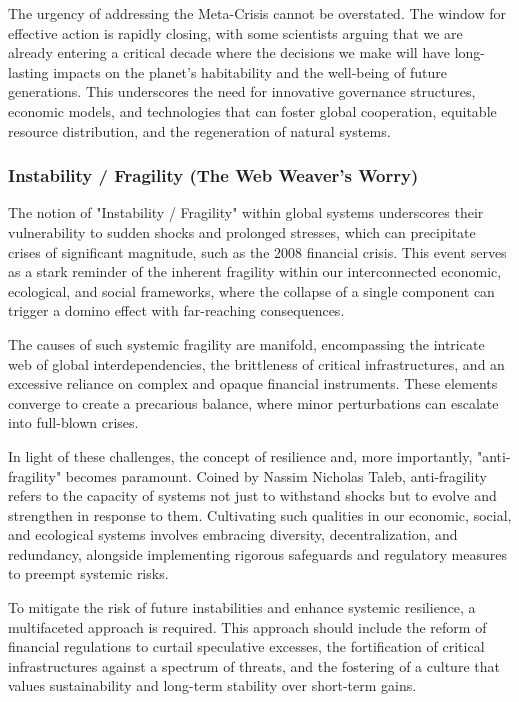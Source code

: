 \documentclass{article}
\begin{document}
The urgency of addressing the Meta-Crisis cannot be overstated. The window for effective action is rapidly closing, with some scientists arguing that we are already entering a critical decade where the decisions we make will have long-lasting impacts on the planet's habitability and the well-being of future generations\cite{SystemicSolutions}. This underscores the need for innovative governance structures, economic models, and technologies that can foster global cooperation, equitable resource distribution, and the regeneration of natural systems.

\subsubsection{Instability / Fragility (The Web Weaver's Worry)}
\label{sec:InstabilityFragility}

The notion of "Instability / Fragility" within global systems underscores their vulnerability to sudden shocks and prolonged stresses, which can precipitate crises of significant magnitude, such as the 2008 financial crisis. This event serves as a stark reminder of the inherent fragility within our interconnected economic, ecological, and social frameworks, where the collapse of a single component can trigger a domino effect with far-reaching consequences\cite{Taleb2012}.

The causes of such systemic fragility are manifold, encompassing the intricate web of global interdependencies, the brittleness of critical infrastructures, and an excessive reliance on complex and opaque financial instruments. These elements converge to create a precarious balance, where minor perturbations can escalate into full-blown crises\cite{FinancialCrisis2008}.

In light of these challenges, the concept of resilience and, more importantly, "anti-fragility" becomes paramount. Coined by Nassim Nicholas Taleb, anti-fragility refers to the capacity of systems not just to withstand shocks but to evolve and strengthen in response to them\cite{SystemicRisks}. Cultivating such qualities in our economic, social, and ecological systems involves embracing diversity, decentralization, and redundancy, alongside implementing rigorous safeguards and regulatory measures to preempt systemic risks\cite{ResilienceStrategies, RegulatoryFrameworks}.

To mitigate the risk of future instabilities and enhance systemic resilience, a multifaceted approach is required. This approach should include the reform of financial regulations to curtail speculative excesses, the fortification of critical infrastructures against a spectrum of threats, and the fostering of a culture that values sustainability and long-term stability over short-term gains.
\end{document}
